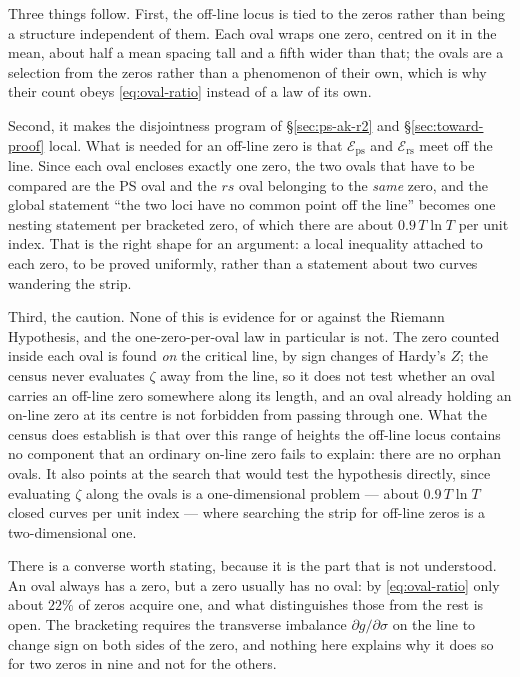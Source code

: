 \documentclass[11pt]{article}
\theoremstyle{definition}
\begin{document}
Three things follow. First, the off-line locus is tied to the zeros rather
than being a structure independent of them. Each oval wraps one zero, centred on
it in the mean, about half a mean spacing tall and a fifth wider than that; the ovals are a
selection from the zeros rather than a phenomenon of their own, which is why
their count obeys \eqref{eq:oval-ratio} instead of a law of its own.

Second, it makes the disjointness program of \S\ref{sec:ps-ak-r2} and
\S\ref{sec:toward-proof} local. What is needed for an off-line zero is that
$\mathcal{E}_{\mathrm{ps}}$ and $\mathcal{E}_{\mathrm{rs}}$ meet off the line.
Since each oval encloses exactly one zero, the two ovals that have to be
compared are the PS oval and the $rs$ oval belonging to the \emph{same} zero,
and the global statement ``the two loci have no common point off the line''
becomes one nesting statement per bracketed zero, of which there are about
$0.9\,T\ln T$ per unit index. That is the right shape for an argument: a local
inequality attached to each zero, to be proved uniformly, rather than a
statement about two curves wandering the strip.

Third, the caution. None of this is evidence for or against the Riemann
Hypothesis, and the one-zero-per-oval law in particular is not. The zero counted
inside each oval is found \emph{on} the critical line, by sign changes of
Hardy's $Z$; the census never evaluates $\zeta$ away from the line, so it does
not test whether an oval carries an off-line zero somewhere along its length,
and an oval already holding an on-line zero at its centre is not forbidden from
passing through one. What the census does establish is that over this range of
heights the off-line locus contains no component that an ordinary on-line zero
fails to explain: there are no orphan ovals. It also points at the search that
would test the hypothesis directly, since evaluating $\zeta$ along the ovals is
a one-dimensional problem --- about $0.9\,T\ln T$ closed curves per unit index
--- where searching the strip for off-line zeros is a two-dimensional one.

There is a converse worth stating, because it is the part that is not
understood. An oval always has a zero, but a zero usually has no oval: by
\eqref{eq:oval-ratio} only about $22\%$ of zeros acquire one, and what
distinguishes those from the rest is open. The bracketing requires the
transverse imbalance $\partial g/\partial\sigma$ on the line to change sign on
both sides of the zero, and nothing here explains why it does so for two zeros
in nine and not for the others.
\end{document}
